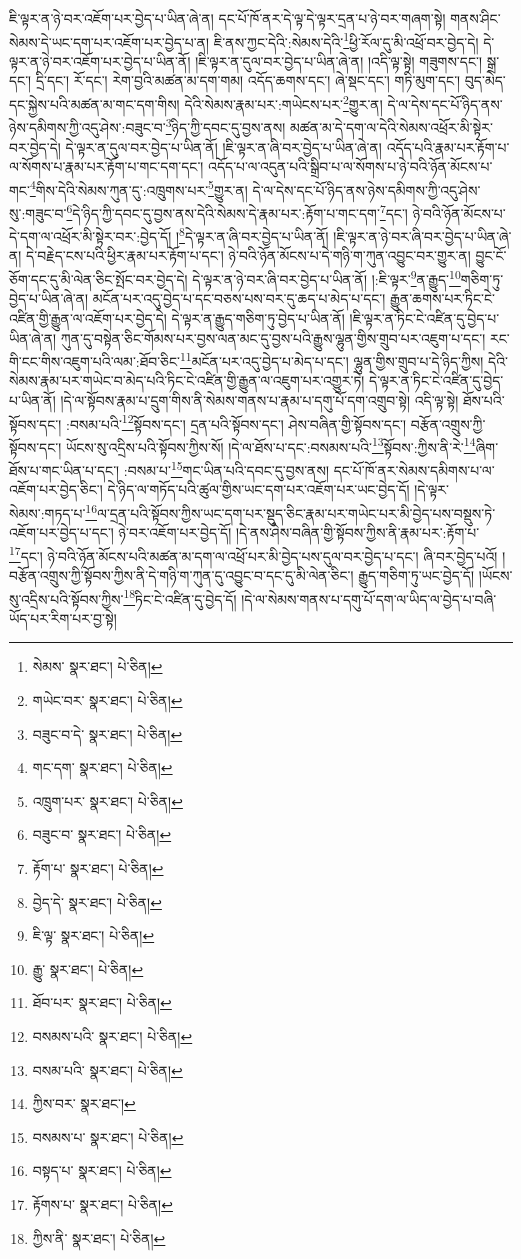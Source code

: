 ཇི་ལྟར་ན་ཉེ་བར་འཇོག་པར་བྱེད་པ་ཡིན་ཞེ་ན། དང་པོ་ཁོ་ནར་དེ་ལྟ་དེ་ལྟར་དྲན་པ་ཉེ་བར་གཞག་སྟེ། གནས་ཤིང་སེམས་དེ་ཡང་དག་པར་འཇོག་པར་བྱེད་པ་ན། ཇི་ནས་ཀྱང་དེའི་:སེམས་དེའི་\footnote{སེམས་  སྣར་ཐང་།  པེ་ཅིན། }ཕྱི་རོལ་དུ་མི་འཕྲོ་བར་བྱེད་དེ། དེ་ལྟར་ན་ཉེ་བར་འཇོག་པར་བྱེད་པ་ཡིན་ནོ། །ཇི་ལྟར་ན་དུལ་བར་བྱེད་པ་ཡིན་ཞེ་ན། །འདི་ལྟ་སྟེ། གཟུགས་དང་། སྒྲ་དང་། དྲི་དང་། རོ་དང་། རེག་བྱའི་མཚན་མ་དག་གམ། འདོད་ཆགས་དང་། ཞེ་སྡང་དང་། གཏི་མུག་དང་། བུད་མེད་དང་སྐྱེས་པའི་མཚན་མ་གང་དག་གིས། དེའི་སེམས་རྣམ་པར་:གཡེངས་པར་\footnote{གཡེང་བར་  སྣར་ཐང་།  པེ་ཅིན། }གྱུར་ན། དེ་ལ་དེས་དང་པོ་ཉིད་ནས་ཉེས་དམིགས་ཀྱི་འདུ་ཤེས་:བཟུང་བ་\footnote{བཟུང་བ་དེ་  སྣར་ཐང་།  པེ་ཅིན། }ཉིད་ཀྱི་དབང་དུ་བྱས་ནས། མཚན་མ་དེ་དག་ལ་དེའི་སེམས་འཕྲོར་མི་སྟེར་བར་བྱེད་དེ། དེ་ལྟར་ན་དུལ་བར་བྱེད་པ་ཡིན་ནོ། །ཇི་ལྟར་ན་ཞི་བར་བྱེད་པ་ཡིན་ཞེ་ན། འདོད་པའི་རྣམ་པར་རྟོག་པ་ལ་སོགས་པ་རྣམ་པར་རྟོག་པ་གང་དག་དང་། འདོད་པ་ལ་འདུན་པའི་སྒྲིབ་པ་ལ་སོགས་པ་ཉེ་བའི་ཉོན་མོངས་པ་གང་\footnote{གང་དག་  སྣར་ཐང་།  པེ་ཅིན། }གིས་དེའི་སེམས་ཀུན་དུ་:འཁྲུགས་པར་\footnote{འཁྲུག་པར་  སྣར་ཐང་།  པེ་ཅིན། }གྱུར་ན། དེ་ལ་དེས་དང་པོ་ཉིད་ནས་ཉེས་དམིགས་ཀྱི་འདུ་ཤེས་སུ་:གཟུང་བ་\footnote{བཟུང་བ་  སྣར་ཐང་།  པེ་ཅིན། }དེ་ཉིད་ཀྱི་དབང་དུ་བྱས་ནས་དེའི་སེམས་དེ་རྣམ་པར་:རྟོག་པ་གང་དག་\footnote{རྟོག་པ་  སྣར་ཐང་།  པེ་ཅིན། }དང་། ཉེ་བའི་ཉོན་མོངས་པ་དེ་དག་ལ་འཕྲོར་མི་སྟེར་བར་:བྱེད་དོ། །\footnote{བྱེད་དེ་  སྣར་ཐང་།  པེ་ཅིན། }དེ་ལྟར་ན་ཞི་བར་བྱེད་པ་ཡིན་ནོ། །ཇི་ལྟར་ན་ཉེ་བར་ཞི་བར་བྱེད་པ་ཡིན་ཞེ་ན། དེ་བརྗེད་ངས་པའི་ཕྱིར་རྣམ་པར་རྟོག་པ་དང་། ཉེ་བའི་ཉོན་མོངས་པ་དེ་གཉི་ག་ཀུན་འབྱུང་བར་གྱུར་ན། བྱུང་ངོ་ཅོག་དང་དུ་མི་ལེན་ཅིང་སྤོང་བར་བྱེད་དེ། དེ་ལྟར་ན་ཉེ་བར་ཞི་བར་བྱེད་པ་ཡིན་ནོ། །:ཇི་ལྟར་\footnote{ཇི་ལྟ་  སྣར་ཐང་།  པེ་ཅིན། }ན་རྒྱུད་\footnote{རྒྱུ་  སྣར་ཐང་།  པེ་ཅིན། }གཅིག་ཏུ་བྱེད་པ་ཡིན་ཞེ་ན། མངོན་པར་འདུ་བྱེད་པ་དང་བཅས་པས་བར་དུ་ཆད་པ་མེད་པ་དང་། རྒྱུན་ཆགས་པར་ཏིང་ངེ་འཛིན་གྱི་རྒྱུན་ལ་འཇོག་པར་བྱེད་དེ། དེ་ལྟར་ན་རྒྱུད་གཅིག་ཏུ་བྱེད་པ་ཡིན་ནོ། །ཇི་ལྟར་ན་ཏིང་ངེ་འཛིན་དུ་བྱེད་པ་ཡིན་ཞེ་ན། ཀུན་དུ་བསྟེན་ཅིང་གོམས་པར་བྱས་ལན་མང་དུ་བྱས་པའི་རྒྱུས་ལྷུན་གྱིས་གྲུབ་པར་འཇུག་པ་དང་། རང་གི་ངང་གིས་འཇུག་པའི་ལམ་:ཐོབ་ཅིང་\footnote{ཐོབ་པར་  སྣར་ཐང་།  པེ་ཅིན། }མངོན་པར་འདུ་བྱེད་པ་མེད་པ་དང་། ལྷུན་གྱིས་གྲུབ་པ་དེ་ཉིད་ཀྱིས། དེའི་སེམས་རྣམ་པར་གཡེང་བ་མེད་པའི་ཏིང་ངེ་འཛིན་གྱི་རྒྱུན་ལ་འཇུག་པར་འགྱུར་ཏེ། དེ་ལྟར་ན་ཏིང་ངེ་འཛིན་དུ་བྱེད་པ་ཡིན་ནོ། །དེ་ལ་སྟོབས་རྣམ་པ་དྲུག་གིས་ནི་སེམས་གནས་པ་རྣམ་པ་དགུ་པོ་དག་འགྲུབ་སྟེ། འདི་ལྟ་སྟེ། ཐོས་པའི་སྟོབས་དང་། :བསམ་པའི་\footnote{བསམས་པའི་  སྣར་ཐང་།  པེ་ཅིན། }སྟོབས་དང་། དྲན་པའི་སྟོབས་དང་། ཤེས་བཞིན་གྱི་སྟོབས་དང་། བརྩོན་འགྲུས་ཀྱི་སྟོབས་དང་། ཡོངས་སུ་འདྲིས་པའི་སྟོབས་ཀྱིས་སོ། །དེ་ལ་ཐོས་པ་དང་:བསམས་པའི་\footnote{བསམ་པའི་  སྣར་ཐང་།  པེ་ཅིན། }སྟོབས་:ཀྱིས་ནི་རེ་\footnote{ཀྱིས་བར་  སྣར་ཐང་། }ཞིག་ཐོས་པ་གང་ཡིན་པ་དང་། :བསམ་པ་\footnote{བསམས་པ་  སྣར་ཐང་།  པེ་ཅིན། }གང་ཡིན་པའི་དབང་དུ་བྱས་ནས། དང་པོ་ཁོ་ནར་སེམས་དམིགས་པ་ལ་འཇོག་པར་བྱེད་ཅིང་། དེ་ཉིད་ལ་གཏོད་པའི་ཚུལ་གྱིས་ཡང་དག་པར་འཇོག་པར་ཡང་བྱེད་དོ། །དེ་ལྟར་སེམས་:གཏད་པ་\footnote{བསྟད་པ་  སྣར་ཐང་།  པེ་ཅིན། }ལ་དྲན་པའི་སྟོབས་ཀྱིས་ཡང་དག་པར་སྡུད་ཅིང་རྣམ་པར་གཡེང་པར་མི་བྱེད་པས་བསྡུས་ཏེ་འཇོག་པར་བྱེད་པ་དང་། ཉེ་བར་འཇོག་པར་བྱེད་དོ། །དེ་ནས་ཤེས་བཞིན་གྱི་སྟོབས་ཀྱིས་ནི་རྣམ་པར་:རྟོག་པ་\footnote{རྟོགས་པ་  སྣར་ཐང་།  པེ་ཅིན། }དང་། ཉེ་བའི་ཉོན་མོངས་པའི་མཚན་མ་དག་ལ་འཕྲོ་པར་མི་བྱེད་པས་དུལ་བར་བྱེད་པ་དང་། ཞི་བར་བྱེད་པའོ། །བརྩོན་འགྲུས་ཀྱི་སྟོབས་ཀྱིས་ནི་དེ་གཉི་ག་ཀུན་དུ་འབྱུང་བ་དང་དུ་མི་ལེན་ཅིང་། རྒྱུད་གཅིག་ཏུ་ཡང་བྱེད་དོ། །ཡོངས་སུ་འདྲིས་པའི་སྟོབས་ཀྱིས་\footnote{ཀྱིས་ནི་  སྣར་ཐང་།  པེ་ཅིན། }ཏིང་ངེ་འཛིན་དུ་བྱེད་དོ། །དེ་ལ་སེམས་གནས་པ་དགུ་པོ་དག་ལ་ཡིད་ལ་བྱེད་པ་བཞི་ཡོད་པར་རིག་པར་བྱ་སྟེ། 
